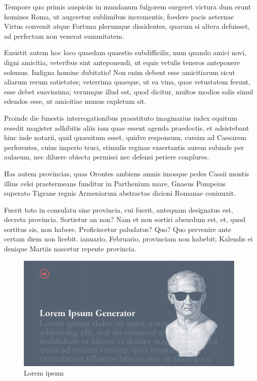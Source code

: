 \documentclass[a4paper]{article}
\begin{document}
{Tempore quo primis auspiciis in mundanum fulgorem surgeret victura dum erunt homines Roma, ut augeretur sublimibus incrementis, foedere pacis aeternae Virtus convenit atque Fortuna plerumque dissidentes, quarum si altera defuisset, ad perfectam non venerat summitatem.

Exsistit autem hoc loco quaedam quaestio subdifficilis, num quando amici novi, digni amicitia, veteribus sint anteponendi, ut equis vetulis teneros anteponere solemus. Indigna homine dubitatio! Non enim debent esse amicitiarum sicut aliarum rerum satietates; veterrima quaeque, ut ea vina, quae vetustatem ferunt, esse debet suavissima; verumque illud est, quod dicitur, multos modios salis simul edendos esse, ut amicitiae munus expletum sit.

Proinde die funestis interrogationibus praestituto imaginarius iudex equitum resedit magister adhibitis aliis iam quae essent agenda praedoctis, et adsistebant hinc inde notarii, quid quaesitum esset, quidve responsum, cursim ad Caesarem perferentes, cuius imperio truci, stimulis reginae exsertantis aurem subinde per aulaeum, nec diluere obiecta permissi nec defensi periere conplures.

Has autem provincias, quas Orontes ambiens amnis imosque pedes Cassii montis illius celsi praetermeans funditur in Parthenium mare, Gnaeus Pompeius superato Tigrane regnis Armeniorum abstractas dicioni Romanae coniunxit.

Fuerit toto in consulatu sine provincia, cui fuerit, antequam designatus est, decreta provincia. Sortietur an non? Nam et non sortiri absurdum est, et, quod sortitus sis, non habere. Proficiscetur paludatus? Quo? Quo pervenire ante certam diem non licebit. ianuario, Februario, provinciam non habebit; Kalendis ei denique Martiis nascetur repente provincia.

\begin{figure}[htbp]
  \begin{center}
    \includegraphics[width=.98\textwidth]{lorem-ipsum-generator-custom-placeholder-text.jpg}
  \end{center}
  \caption{Lorem ipsum}
  \label{fig:2}
\end{figure}

}
\end{document}
